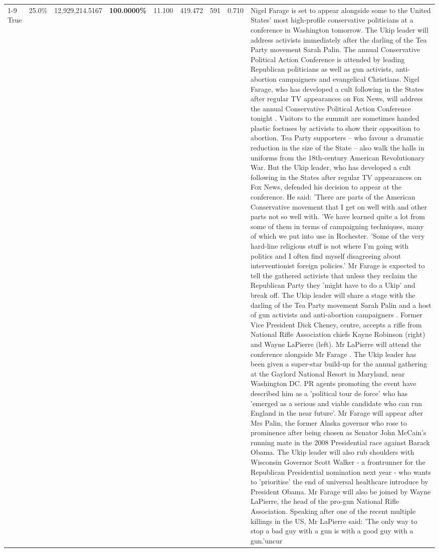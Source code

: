 \begin{table}[H]
\begin{tabular}{lllrlllll}
\cline{1-9}
True & 25.0\% & 12,929,214.5167 & \bfseries \color{red} 100.0000\% & 11.100 & 419.472 & 591 & 0.710 & Nigel Farage is set to appear alongside some to the United States' most high-profile conservative politicians at a conference in Washington tomorrow. The Ukip leader will address activists immediately after the darling of the Tea Party movement Sarah Palin. The annual Conservative Political Action Conference is attended by leading Republican politicians as well as gun activists, anti-abortion campaigners and evangelical Christians. Nigel Farage, who has developed a cult following in the States after regular TV appearances on Fox News, will address the annual Conservative Political Action Conference tonight . Visitors to the summit are sometimes handed plastic foetuses by activists to show their opposition to abortion. Tea Party supporters – who favour a dramatic reduction in the size of the State – also walk the halls in uniforms from the 18th-century American Revolutionary War. But the Ukip leader, who has developed a cult following in the States after regular TV appearances on Fox News, defended his decision to appear at the conference. He said: 'There are parts of the American Conservative movement that I get on well with and other parts not so well with. 'We have learned quite a lot from some of them in terms of campaigning techniques, many of which we put into use in Rochester. 'Some of the very hard-line religious stuff is not where I'm going with politics and I often find myself disagreeing about interventionist foreign policies.' Mr Farage is expected to tell the gathered activists that unless they reclaim the Republican Party they 'might have to do a Ukip' and break off. The Ukip leader will share a stage with the darling of the Tea Party movement Sarah Palin and a host of gun activists and anti-abortion campaigners . Former Vice President Dick Cheney, centre, accepts a rifle from National Rifle Association chiefs Kayne Robinson (right) and Wayne LaPierre (left). Mr LaPierre will attend the conference alongside Mr Farage . The Ukip leader has been given a super-star build-up for the annual gathering at the Gaylord National Resort in Maryland, near Washington DC. PR agents promoting the event have described him as a 'political tour de force' who has 'emerged as a serious and viable candidate who can run England in the near future'. Mr Farage will appear after Mrs Palin, the former Alaska governor who rose to prominence after being chosen as Senator John McCain's running mate in the 2008 Presidential race against Barack Obama. The Ukip leader will also rub shoulders with Wisconsin Governor Scott Walker - a frontrunner for the Republican Presidential nomination next year - who wants to 'prioritise' the end of universal healthcare introduce by President Obama. Mr Farage will also be joined by Wayne LaPierre, the head of the pro-gun National Rifle Association. Speaking after one of the recent multiple killings in the US, Mr LaPierre said: 'The only way to stop a bad guy with a gun is with a good guy with a gun.'uncur \\

\end{tabular}
\end{table}

